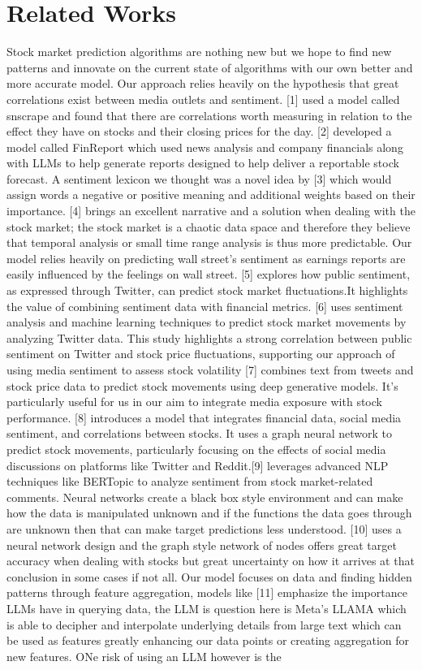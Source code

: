 \section{Related Works
}
\label{sec:headings}
Stock market prediction algorithms are nothing new but we hope to find new patterns and innovate on the current state of algorithms with our own better and more accurate model. Our approach relies heavily on the hypothesis that great correlations exist between media outlets and sentiment. [1] used a model called snscrape and found that there are correlations worth measuring in relation to the effect they have on stocks and their closing prices for the day. [2] developed a model called FinReport which used news analysis and company financials along with LLMs to help generate reports designed to help deliver a reportable stock forecast. A sentiment lexicon we thought was a novel idea by [3] which would assign words a negative or positive meaning and additional weights based on their importance. [4] brings an excellent narrative and a solution when dealing with the stock market; the stock market is a chaotic data space and therefore they believe that temporal analysis or small time range analysis is thus more predictable. Our model relies heavily on predicting wall street's sentiment as earnings reports are easily influenced by the feelings on wall street. [5] explores how public sentiment, as expressed through Twitter, can predict stock market fluctuations.It highlights the value of combining sentiment data with financial metrics. [6] uses sentiment analysis and machine learning techniques to predict stock market movements by analyzing Twitter data. This study highlights a strong correlation between public sentiment on Twitter and stock price fluctuations, supporting our approach of using media sentiment to assess stock volatility [7] combines text from tweets and stock price data to predict stock movements using deep generative models. It's particularly useful for us in our aim to integrate media exposure with stock performance. [8] introduces a model that integrates financial data, social media sentiment, and correlations between stocks. It uses a graph neural network to predict stock movements, particularly focusing on the effects of social media discussions on platforms like Twitter and Reddit.[9] leverages advanced NLP techniques like BERTopic to analyze sentiment from stock market-related comments. Neural networks create a black box style environment and can make how the data is manipulated unknown and if the functions the data goes through are unknown then that can make target predictions less understood. [10] uses a neural network design and the graph style network of nodes offers great target accuracy when dealing with stocks but great uncertainty on how it arrives at that conclusion in some cases if not all. Our model focuses on data and finding hidden patterns through feature aggregation, models like [11] emphasize the importance LLMs have in querying data, the LLM is question here is Meta’s LLAMA which is able to decipher and interpolate underlying details from large text which can be used as features greatly enhancing our data points or creating aggregation for new features. ONe risk of using an LLM however is the 